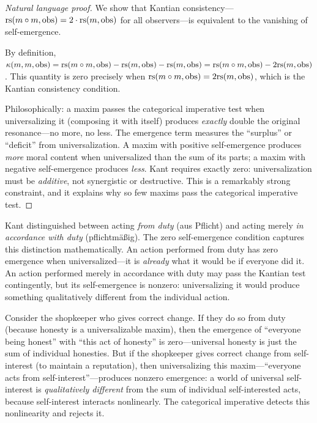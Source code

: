 \begin{proof}[Natural language proof]
We show that Kantian consistency---$\mathrm{rs}(m \circ m, \mathrm{obs}) =
2 \cdot \mathrm{rs}(m, \mathrm{obs})$ for all observers---is equivalent to the vanishing
of self-emergence.

By definition, $\kappa(m, m, \mathrm{obs}) = \mathrm{rs}(m \circ m, \mathrm{obs})
- \mathrm{rs}(m, \mathrm{obs}) - \mathrm{rs}(m, \mathrm{obs}) = \mathrm{rs}(m \circ m, \mathrm{obs})
- 2\mathrm{rs}(m, \mathrm{obs})$. This quantity is zero precisely when
$\mathrm{rs}(m \circ m, \mathrm{obs}) = 2\mathrm{rs}(m, \mathrm{obs})$, which is the
Kantian consistency condition.

Philosophically: a maxim passes the categorical imperative test when
universalizing it (composing it with itself) produces \emph{exactly} double
the original resonance---no more, no less. The emergence term measures the
``surplus'' or ``deficit'' from universalization. A maxim with positive
self-emergence produces \emph{more} moral content when universalized than the
sum of its parts; a maxim with negative self-emergence produces \emph{less}.
Kant requires exactly zero: universalization must be \emph{additive}, not
synergistic or destructive. This is a remarkably strong constraint, and it
explains why so few maxims pass the categorical imperative test.
\end{proof}

\begin{interpretation}
Kant distinguished between acting \emph{from duty} (aus Pflicht) and acting
merely \emph{in accordance with duty} (pflichtm\"a\ss ig). The zero
self-emergence condition captures this distinction mathematically. An action
performed from duty has zero emergence when universalized---it is
\emph{already} what it would be if everyone did it. An action performed
merely in accordance with duty may pass the Kantian test contingently, but
its self-emergence is nonzero: universalizing it would produce something
qualitatively different from the individual action.

Consider the shopkeeper who gives correct change. If they do so from duty
(because honesty is a universalizable maxim), then the emergence of
``everyone being honest'' with ``this act of honesty'' is zero---universal
honesty is just the sum of individual honesties. But if the shopkeeper
gives correct change from self-interest (to maintain a reputation), then
universalizing this maxim---``everyone acts from self-interest''---produces
nonzero emergence: a world of universal self-interest is \emph{qualitatively
different} from the sum of individual self-interested acts, because
self-interest interacts nonlinearly. The categorical imperative detects this
nonlinearity and rejects it.
\end{interpretation}

